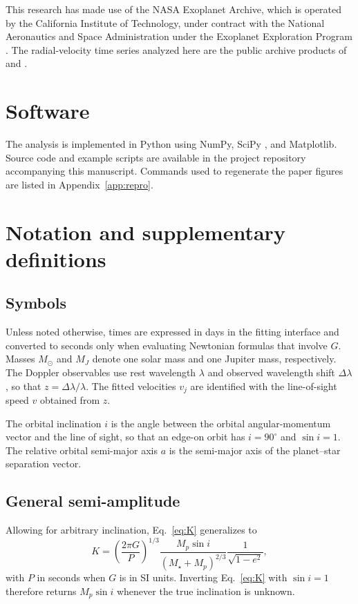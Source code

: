 \documentclass[11pt]{article}
\begin{document}
This research has made use of the NASA Exoplanet Archive, which is operated by
the California Institute of Technology, under contract with the National
Aeronautics and Space Administration under the Exoplanet Exploration Program
\citep{christiansen2025nea}. The radial-velocity time series analyzed here are
the public archive products of \citet{marcy1997peg} and
\citet{butler2006catalog}.

\section*{Software}

The analysis is implemented in Python using NumPy, SciPy
\citep{virtanen2020scipy}, and Matplotlib. Source code and example scripts are
available in the project repository accompanying this manuscript. Commands used
to regenerate the paper figures are listed in Appendix~\ref{app:repro}.

\appendix

\section{Notation and supplementary definitions}
\label{app:notation}

\subsection*{Symbols}

Unless noted otherwise, times are expressed in days in the fitting interface and
converted to seconds only when evaluating Newtonian formulas that involve $G$.
Masses $M_\odot$ and $M_J$ denote one solar mass and one Jupiter mass,
respectively. The Doppler observables use rest wavelength $\lambda$ and
observed wavelength shift $\Delta\lambda$, so that
$z=\Delta\lambda/\lambda$. The fitted velocities $v_j$ are identified with the
line-of-sight speed $v$ obtained from $z$.

The orbital inclination $i$ is the angle between the orbital angular-momentum
vector and the line of sight, so that an edge-on orbit has $i=90^\circ$ and
$\sin i = 1$. The relative orbital semi-major axis $a$ is the semi-major axis
of the planet--star separation vector.

\subsection*{General semi-amplitude}

Allowing for arbitrary inclination, Eq.~\eqref{eq:K} generalizes to
\begin{equation}
K
=
\left(\frac{2\pi G}{P}\right)^{1/3}
\frac{M_p\sin i}{(M_\star + M_p)^{2/3}}
\frac{1}{\sqrt{1-e^2}},
\label{eq:K-general}
\end{equation}
with $P$ in seconds when $G$ is in SI units. Inverting Eq.~\eqref{eq:K} with
$\sin i = 1$ therefore returns $M_p\sin i$ whenever the true inclination is
unknown.
\end{document}
